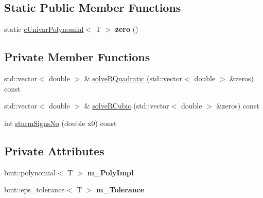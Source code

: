 \subsection*{Static Public Member Functions}
\begin{DoxyCompactItemize}
\item 
\hypertarget{classcUnivarPolynomial_ae6d336689220ead8386c08aa5e7b540b}{static \hyperlink{classcUnivarPolynomial}{c\-Univar\-Polynomial}$<$ T $>$ {\bfseries zero} ()}\label{classcUnivarPolynomial_ae6d336689220ead8386c08aa5e7b540b}

\end{DoxyCompactItemize}
\subsection*{Private Member Functions}
\begin{DoxyCompactItemize}
\item 
std\-::vector$<$ double $>$ \& \hyperlink{classcUnivarPolynomial_a887727886c8d9ed3a789b10de1c50785}{solve\-R\-Quadratic} (std\-::vector$<$ double $>$ \&zeros) const 
\item 
std\-::vector$<$ double $>$ \& \hyperlink{classcUnivarPolynomial_a9203e9c2e0c7d1f4d70c13b08e37d5ff}{solve\-R\-Cubic} (std\-::vector$<$ double $>$ \&zeros) const 
\item 
int \hyperlink{classcUnivarPolynomial_a3faca94991f37531436883070bcc7f01}{sturm\-Signs\-No} (double x0) const 
\end{DoxyCompactItemize}
\subsection*{Private Attributes}
\begin{DoxyCompactItemize}
\item 
\hypertarget{classcUnivarPolynomial_a76cee4a4b33c7ca3b2b23b7310f937e0}{bmt\-::polynomial$<$ T $>$ {\bfseries m\-\_\-\-Poly\-Impl}}\label{classcUnivarPolynomial_a76cee4a4b33c7ca3b2b23b7310f937e0}

\item 
\hypertarget{classcUnivarPolynomial_a144f68114be5e7f026f40d44c8d5fedd}{bmt\-::eps\-\_\-tolerance$<$ T $>$ {\bfseries m\-\_\-\-Tolerance}}\label{classcUnivarPolynomial_a144f68114be5e7f026f40d44c8d5fedd}

\end{DoxyCompactItemize}
